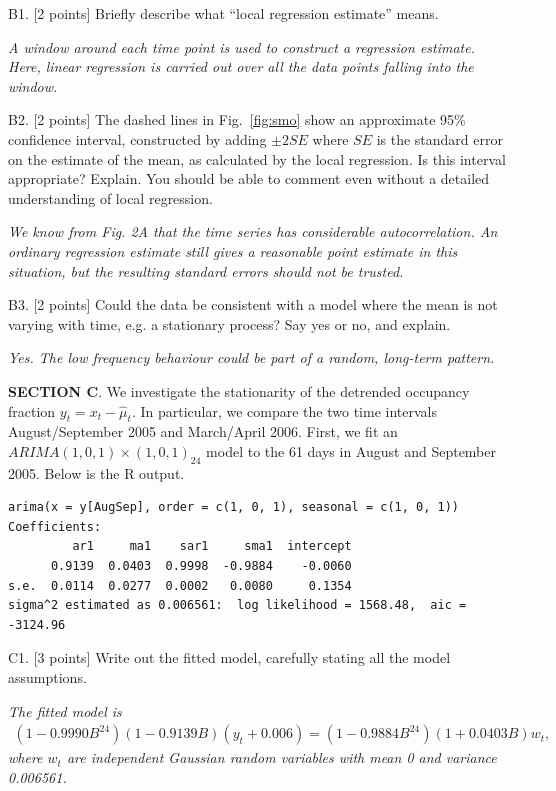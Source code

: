 \documentclass[11pt]{article}
\begin{document}
B1. [2 points] Briefly describe what ``local regression estimate''
means.

{\it A window around each time point is used to construct a regression
estimate. Here, linear regression is carried out over all the data
points falling into the window.}


B2. [2 points] The dashed lines in Fig.~\ref{fig:smo} show an
approximate 95\% confidence interval, constructed by adding $\pm
2SE$ where $SE$ is the standard error on the estimate of the mean,
as calculated by the local regression. Is this interval appropriate?
Explain. You should be able to comment even without a detailed
understanding of local regression.

{\it
We know from Fig. 2A that the time series has considerable
autocorrelation. An ordinary regression estimate still gives a
reasonable point estimate in this situation, but the resulting
standard errors should not be trusted.
}

B3. [2 points] Could the data be consistent with a model where the
mean is not varying with time, e.g. a stationary process? Say yes or
no, and explain.

{\it Yes. The low frequency behaviour could be part of a random,
long-term pattern.
}


{\bf SECTION C}. We investigate the stationarity of the detrended occupancy fraction $y_t=x_t-\hat\mu_t$. In particular, we compare the two time intervals  August/September 2005 and March/April 2006.
First, we fit an $ARIMA(1,0,1){\times}(1,0,1)_{24}$ model to the 61 days in August and September 2005. Below is the R output.

\begin{verbatim}
arima(x = y[AugSep], order = c(1, 0, 1), seasonal = c(1, 0, 1))
Coefficients:
         ar1     ma1    sar1     sma1  intercept
      0.9139  0.0403  0.9998  -0.9884    -0.0060
s.e.  0.0114  0.0277  0.0002   0.0080     0.1354
sigma^2 estimated as 0.006561:  log likelihood = 1568.48,  aic = -3124.96
\end{verbatim}
C1. [3 points] Write out the fitted model, carefully stating all the
model assumptions.

{\it
The fitted model is
\begin{eqnarray*}
(1-0.9990B^{24})(1-0.9139B)(y_t + 0.006) =
(1-0.9884B^{24})(1+0.0403B)w_t,
\end{eqnarray*}
where $w_t$ are independent Gaussian random variables with mean 0
and variance 0.006561.
}
\end{document}
